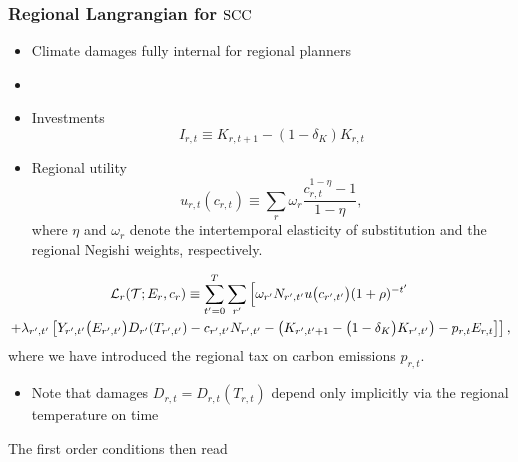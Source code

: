 \documentclass[preprint,3p,authoryear]{elsarticle}
\begin{document}
\subsubsection{Regional Langrangian for $\operatorname{SCC}$}
\label{sec:Lreg}
\begin{itemize}
\item Climate damages fully internal for regional planners
\item {}
\end{itemize}
\begin{itemize}
\item Investments 
\begin{equation}
  \label{eq:Ir}
  I_{r,t}\equiv K_{r,t+1}-(1-\delta_K)K_{r,t}
\end{equation}

\item Regional utility
\begin{equation}
  \label{eq:ur}
  u_{r,t}(c_{r,t})\equiv\sum_r \omega_r\frac{c_{r,t}^{1-\eta}-1}{1-\eta},
\end{equation}
where $\eta$ and $\omega_r$ denote the intertemporal elasticity of substitution and the regional Negishi weights, respectively.
\end{itemize}
\begin{multline}
  \label{eq:Lreg} \mathcal{L}_r(\mathcal{T};E_r,c_r)\equiv\sum_{t'=0}^{T}\sum_{r'}\left[\omega_{r'}N_{r',t'}u\big(c_{r',t'}\big)(1+\rho)^{-t'}\right.\\
  \left.+\lambda_{r',t'}\left[Y_{r',t'}\big(E_{r',t'}\big)D_{r'}(T_{r',t'}) -c_{r',t'}N_{r',t'}-\left(K_{r',t'+1}-\big(1-\delta_K\big)K_{r',t'}\right)-p_{r,t}E_{r,t} \right]\right],
\end{multline}
where we have introduced the regional tax on carbon emissions $p_{r,t}$.
\begin{itemize}
\item Note that damages $D_{r,t}=D_{r,t}(T_{r,t})$ depend only implicitly via the regional temperature on time
\end{itemize}
The first order conditions then read
\end{document}
